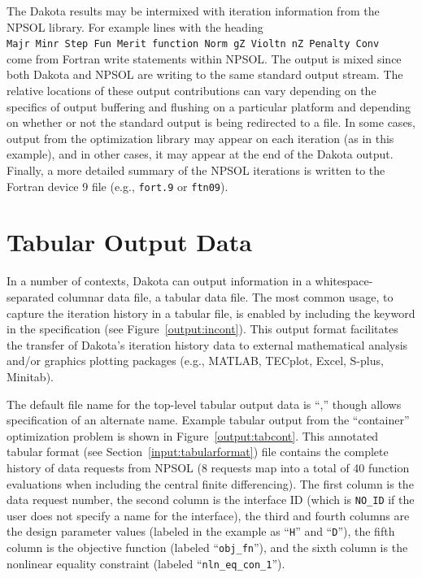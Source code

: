 The Dakota results may be intermixed with iteration information from
the NPSOL library. For example lines with the heading\\
\texttt{Majr Minr Step Fun Merit function Norm gZ Violtn nZ Penalty Conv}\\
come from Fortran write statements within NPSOL. The output is mixed since
both Dakota and NPSOL are writing to the same standard output
stream. The relative locations of these output contributions can vary
depending on the specifics of output buffering and flushing on a
particular platform and depending on whether or not the standard
output is being redirected to a file. In some cases, output from the
optimization library may appear on each iteration (as in this
example), and in other cases, it may appear at the end of the Dakota
output. Finally, a more detailed summary of the NPSOL iterations is
written to the Fortran device 9 file (e.g., \texttt{fort.9} or
\texttt{ftn09}).

\section{Tabular Output Data}\label{output:tabular}

In a number of contexts, Dakota can output information in a
whitespace-separated columnar data file, a tabular data file.  The
most common usage, to capture the iteration history in a tabular file,
is enabled by including the keyword  in the
 specification (see
Figure~\ref{output:incont}). This output format facilitates the
transfer of Dakota's iteration history data to external mathematical
analysis and/or graphics plotting packages (e.g., MATLAB, TECplot,
Excel, S-plus, Minitab).

The default file name for the top-level tabular output data is
``,'' though 
allows specification of an alternate name.  Example tabular output
from the ``container'' optimization problem is shown in
Figure~\ref{output:tabcont}. This annotated tabular format (see
Section~\ref{input:tabularformat}) file contains the complete history
of data requests from NPSOL (8 requests map into a total of 40
function evaluations when including the central finite
differencing). The first column is the data request number, the second
column is the interface ID (which is \texttt{NO\_ID} if the user does
not specify a name for the interface), the third and fourth columns
are the design parameter values (labeled in the example as
``\texttt{H}'' and ``\texttt{D}''), the fifth column is the objective
function (labeled ``\texttt{obj\_fn}''), and the sixth column is the
nonlinear equality constraint (labeled ``\texttt{nln\_eq\_con\_1}'').

